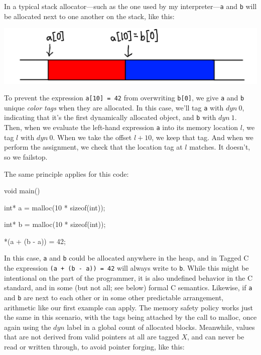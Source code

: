 \documentclass{article}
\begin{document}
In a typical stack allocator---such as the one used by my interpreter---{\tt a} and {\tt b} will
be allocated next to one another on the stack, like this:

\includegraphics[width=.5\textwidth]{example.png}

To prevent the expression {\tt a[10] = 42} from overwriting {\tt b[0]}, we give {\tt a} and {\tt b}
unique {\it color tags} when they are allocated. In this case, we'll tag {\tt a} with \(\mathit{dyn ~ 0}\),
indicating that it's the first dynamically allocated object, and {\tt b} with \(\mathit{dyn ~ 1}\).
Then, when we evaluate the left-hand expression {\tt a} into its memory location \(l\), we tag
\(l\) with \(\mathit{dyn ~ 0}\). When we take the offset \(l + 10\), we keep that tag. And when we
perform the assignment, we check that the location tag at \(l\) matches. It doesn't, so we failstop.

The same principle applies for this code:

\vspace{\abovedisplayskip}
{\tt

  void main() {

    int* a = malloc(10 * sizeof(int));

    int* b = malloc(10 * sizeof(int));

    *(a + (b - a)) = 42;

  }

}
\vspace{\belowdisplayskip}

In this case, {\tt a} and {\tt b} could be allocated anywhere in the heap, and in Tagged C
the expression {\tt *(a + (b - a)) = 42} will always write to {\tt *b}. While this might be intentional
on the part of the programmer, it is also undefined behavior in the C standard, and in some
(but not all; see below) formal C semantics. Likewise, if {\tt a} and {\tt b} are next to each other
or in some other predictable arrangement, arithmetic like our first example can apply.
The memory safety policy works just the same in this scenario, with the tags being attached
by the call to malloc, once again using the \(\mathit{dyn}\) label in a global count of allocated blocks.
Meanwhile, values that are not derived from valid pointers at all are tagged \(X\), and can never
be read or written through, to avoid pointer forging, like this:
\end{document}
